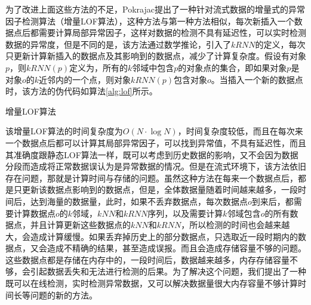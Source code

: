 为了改进上面这些方法的不足，Pokrajac提出了一种针对流式数据的增量式的异常因子检测算法（增量LOF算法），这种方法与第一种方法相似，每次新插入一个数据点后都需要计算局部异常因子，这样对数据的检测不具有延迟性，可以实时检测数据的异常度，但是不同的是，该方法通过数学推论，引入了$kRNN$的定义，每次只更新计算新插入的数据点及其影响到的数据点，减少了计算复杂度。假设有对象$p$，则$kRNN(p)$定义为，所有的$k$邻域中包含$p$的对象点的集合，即如果对象$p$是对象$o$的$k$近邻内的一个点，则对象$kRNN(p)$包含对象$o$。当插入一个新的数据点时，该方法的伪代码如算法\ref{alg:lof}所示。

\begin{algorithm}%
	
    \caption{增量LOF算法}
    \label{alg:lof}
\end{algorithm}

该增量LOF算法的时间复杂度为$O\left (N\cdot \log N \right )$，时间复杂度较低，而且在每次来一个数据点后都可以计算其局部异常因子，可以找到异常值，不具有延迟性，而且其准确度跟静态LOF算法一样，既可以考虑到历史数据的影响，又不会因为数据分段而造成将正常数据误认为是异常数据的情况。但是在流式环境下，该方法依旧存在问题，那就是计算时间与存储的问题。虽然这种方法在每来一个数据点后，都是只更新该数据点影响到的数据点，但是，全体数据量随着时间越来越多，一段时间后，达到海量的数据量，此时，如果不丢弃数据点，每次数据点$o$到来后，都需要计算数据点$o$的$k$邻域，$kNN$和$kRNN$序列，以及需要计算$k$邻域包含$o$的所有数据点，并且计算更新这些数据点的$kNN$和$kRNN$，所以检测的时间也会越来越大，会造成计算缓慢。如果丢弃掉历史上的部分数据点，只选取近一段时期内的数据点，又会造成不精确的结果，甚至造成误报。而且会造成存储容量不够的问题。这些数据点都是存储在内存中的，一段时间后，数据越来越多，内存存储容量不够，会引起数据丢失和无法进行检测的后果。为了解决这个问题，我们提出了一种既可以在线检测，实时检测异常数据，又可以解决数据量很大内存容量不够计算时间长等问题的新的方法。

